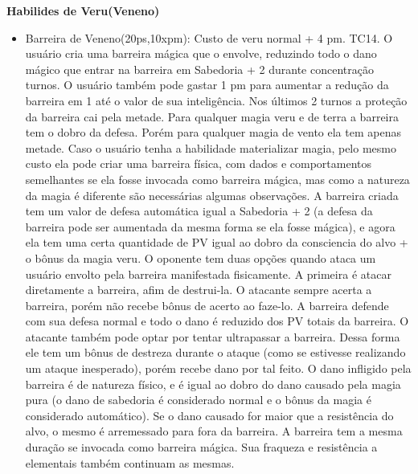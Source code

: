 \textbf{Habilides de Veru(Veneno)}
\begin{itemize}


	\item Barreira de Veneno(20ps,10xpm): Custo de veru normal + 4 pm. TC14.\newline
O usuário cria uma barreira mágica que o envolve, reduzindo todo o dano mágico que entrar na barreira em Sabedoria + 2 durante concentração turnos. O usuário também pode gastar 1 pm para aumentar a redução da barreira em 1 até o valor de sua inteligência. Nos últimos 2 turnos a proteção da barreira cai pela metade. Para qualquer magia veru e de terra a barreira tem o dobro da defesa. Porém para qualquer magia de vento ela tem apenas metade. Caso o usuário tenha a habilidade materializar magia, pelo mesmo custo ela pode criar uma barreira física, com dados e comportamentos semelhantes se ela fosse invocada como barreira mágica, mas como a natureza da magia é diferente são necessárias algumas observações. A barreira criada tem um valor de defesa automática igual a Sabedoria + 2 (a defesa da barreira pode ser aumentada da mesma forma se ela fosse mágica), e agora ela tem uma certa quantidade de PV igual ao dobro da consciencia do alvo + o bônus da magia veru. O oponente tem duas opções quando ataca um usuário envolto pela barreira manifestada fisicamente. A primeira é atacar diretamente a barreira, afim de destrui-la. O atacante sempre acerta a barreira, porém não recebe bônus de acerto ao faze-lo. A barreira defende com sua defesa normal e todo o dano é reduzido dos PV totais da barreira. O atacante também pode optar por tentar ultrapassar a barreira. Dessa forma ele tem um bônus de destreza durante o ataque (como se estivesse realizando um ataque inesperado), porém recebe dano por tal feito. O dano infligido pela barreira é de natureza físico, e é igual ao dobro do dano causado pela magia pura (o dano de sabedoria é considerado normal e o bônus da magia é considerado automático). Se o dano causado for maior que a resistência do alvo, o mesmo é arremessado para fora da barreira. A barreira tem a mesma duração se invocada como barreira mágica. Sua fraqueza e resistência a elementais também continuam as mesmas. 



\end{itemize}
